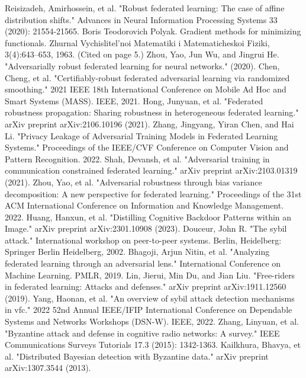 \documentclass[conference]{IEEEtran}
\begin{document}
\begin{thebibliography}{00}
     Reisizadeh, Amirhossein, et al. "Robust federated learning: The case of affine distribution shifts." Advances in Neural Information Processing Systems 33 (2020): 21554-21565.
     Boris Teodorovich Polyak. Gradient methods for minimizing functionals. Zhurnal Vychislitel'noi Matematiki i Matematicheskoi Fiziki, 3(4):643–653, 1963. (Cited on page 5.)
     Zhou, Yao, Jun Wu, and Jingrui He. "Adversarially robust federated learning for neural networks." (2020).
     Chen, Cheng, et al. "Certifiably-robust federated adversarial learning via randomized smoothing." 2021 IEEE 18th International Conference on Mobile Ad Hoc and Smart Systems (MASS). IEEE, 2021.
     Hong, Junyuan, et al. "Federated robustness propagation: Sharing robustness in heterogeneous federated learning." arXiv preprint arXiv:2106.10196 (2021).
     Zhang, Jingyang, Yiran Chen, and Hai Li. "Privacy Leakage of Adversarial Training Models in Federated Learning Systems." Proceedings of the IEEE/CVF Conference on Computer Vision and Pattern Recognition. 2022.
     Shah, Devansh, et al. "Adversarial training in communication constrained federated learning." arXiv preprint arXiv:2103.01319 (2021).
     Zhou, Yao, et al. "Adversarial robustness through bias variance decomposition: A new perspective for federated learning." Proceedings of the 31st ACM International Conference on Information and Knowledge Management. 2022.
     Huang, Hanxun, et al. "Distilling Cognitive Backdoor Patterns within an Image." arXiv preprint arXiv:2301.10908 (2023).
     Douceur, John R. "The sybil attack." International workshop on peer-to-peer systems. Berlin, Heidelberg: Springer Berlin Heidelberg, 2002.
     Bhagoji, Arjun Nitin, et al. "Analyzing federated learning through an adversarial lens." International Conference on Machine Learning. PMLR, 2019.
     Lin, Jierui, Min Du, and Jian Liu. "Free-riders in federated learning: Attacks and defenses." arXiv preprint arXiv:1911.12560 (2019).
     Yang, Haonan, et al. "An overview of sybil attack detection mechanisms in vfc." 2022 52nd Annual IEEE/IFIP International Conference on Dependable Systems and Networks Workshops (DSN-W). IEEE, 2022.
     Zhang, Linyuan, et al. "Byzantine attack and defense in cognitive radio networks: A survey." IEEE Communications Surveys  Tutorials 17.3 (2015): 1342-1363.
     Kailkhura, Bhavya, et al. "Distributed Bayesian detection with Byzantine data." arXiv preprint arXiv:1307.3544 (2013).

\end{thebibliography}
\end{document}
